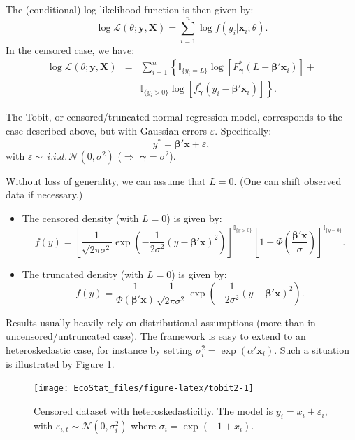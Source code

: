 \documentclass[
  12pt,
]{book}
\theoremstyle{definition}
\theoremstyle{definition}
\theoremstyle{definition}
\theoremstyle{definition}
\theoremstyle{remark}
\begin{document}
The (conditional) log-likelihood function is then given by:
\[
\log \mathcal{L}(\theta;\mathbf{y},\mathbf{X}) = \sum_{i=1}^n \log f(y_i|\mathbf{x}_i;\theta).
\]
In the censored case, we have:
\begin{eqnarray*}
\log \mathcal{L}(\theta;\mathbf{y},\mathbf{X}) &=& \sum_{i=1}^n \left\{
\mathbb{I}_{\{y_i=L\}}\log\left[F_{\boldsymbol\gamma}^*(L-  \boldsymbol\beta'\mathbf{x}_i)\right] + \right.\\
&& \left. \mathbb{I}_{\{y_i>0\}} \log \left[f_{\boldsymbol\gamma}^*(y_i -  \boldsymbol\beta'\mathbf{x}_i)\right]\right\}.
\end{eqnarray*}

The Tobit, or censored/truncated normal regression model, corresponds to the case described above, but with Gaussian errors \(\varepsilon\). Specifically:
\[
y^* = \boldsymbol\beta'\mathbf{x} + \varepsilon,
\]
with \(\varepsilon \sim \,i.i.d.\,\mathcal{N}(0,\sigma^2)\) (\(\Rightarrow\) \(\boldsymbol\gamma = \sigma^2\)).

Without loss of generality, we can assume that \(L=0\). (One can shift observed data if necessary.)

\begin{itemize}
\item
  The censored density (with \(L=0\)) is given by:
  \[
  f(y) = \left[
  \frac{1}{\sqrt{2 \pi \sigma^2}}\exp\left(-\frac{1}{2 \sigma^2}(y - \boldsymbol\beta'\mathbf{x})^2\right)
  \right]^{\mathbb{I}_{\{y>0\}}}
  \left[
  1 - \Phi\left(\frac{\boldsymbol\beta'\mathbf{x}}{\sigma}\right)
  \right]^{\mathbb{I}_{\{y=0\}}}.
  \]
\item
  The truncated density (with \(L=0\)) is given by:
  \[
  f(y) = \frac{1}{\Phi(\boldsymbol\beta'\mathbf{x})}
  \frac{1}{\sqrt{2 \pi \sigma^2}}\exp\left(-\frac{1}{2 \sigma^2}(y - \boldsymbol\beta'\mathbf{x})^2\right).
  \]
\end{itemize}

Results usually heavily rely on distributional assumptions (more than in uncensored/untruncated case). The framework is easy to extend to an heteroskedastic case, for instance by setting \(\sigma_i^2=\exp(\alpha'\mathbf{x}_i)\). Such a situation is illustrated by Figure \ref{fig:tobit2}.

\begin{figure}
\texttt{[image: EcoStat\_files/figure-latex/tobit2-1]} \caption{Censored dataset with heteroskedasticitiy. The model is $y_i = x_i + \varepsilon_i$, with $\varepsilon_{i,t} \sim \mathcal{N}(0,\sigma_i^2)$ where $\sigma_i = \exp(-1 + x_i)$.}\label{fig:tobit2}
\end{figure}
\end{document}
